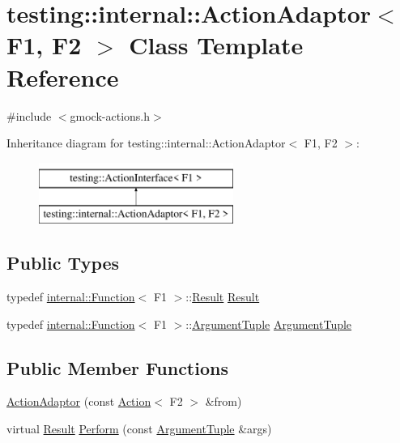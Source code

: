 \hypertarget{classtesting_1_1internal_1_1ActionAdaptor}{}\section{testing\+::internal\+::Action\+Adaptor$<$ F1, F2 $>$ Class Template Reference}
\label{classtesting_1_1internal_1_1ActionAdaptor}


{\ttfamily \#include $<$gmock-\/actions.\+h$>$}

Inheritance diagram for testing\+::internal\+::Action\+Adaptor$<$ F1, F2 $>$\+:\begin{figure}[H]
\begin{center}
\leavevmode
\includegraphics[height=2.000000cm]{classtesting_1_1internal_1_1ActionAdaptor}
\end{center}
\end{figure}
\subsection*{Public Types}
\begin{DoxyCompactItemize}
\item 
typedef \mbox{\hyperlink{structtesting_1_1internal_1_1Function}{internal\+::\+Function}}$<$ F1 $>$\+::\mbox{\hyperlink{classtesting_1_1internal_1_1ActionAdaptor_afa8f7872b6db3d8f1545fd98b45b0b95}{Result}} \mbox{\hyperlink{classtesting_1_1internal_1_1ActionAdaptor_afa8f7872b6db3d8f1545fd98b45b0b95}{Result}}
\item 
typedef \mbox{\hyperlink{structtesting_1_1internal_1_1Function}{internal\+::\+Function}}$<$ F1 $>$\+::\mbox{\hyperlink{classtesting_1_1internal_1_1ActionAdaptor_a4f78fb73f97b72fea8a93b78a8ab5704}{Argument\+Tuple}} \mbox{\hyperlink{classtesting_1_1internal_1_1ActionAdaptor_a4f78fb73f97b72fea8a93b78a8ab5704}{Argument\+Tuple}}
\end{DoxyCompactItemize}
\subsection*{Public Member Functions}
\begin{DoxyCompactItemize}
\item 
\mbox{\hyperlink{classtesting_1_1internal_1_1ActionAdaptor_a24ba3330ef3cc365b956c50ec73e4177}{Action\+Adaptor}} (const \mbox{\hyperlink{classtesting_1_1Action}{Action}}$<$ F2 $>$ \&from)
\item 
virtual \mbox{\hyperlink{classtesting_1_1internal_1_1ActionAdaptor_afa8f7872b6db3d8f1545fd98b45b0b95}{Result}} \mbox{\hyperlink{classtesting_1_1internal_1_1ActionAdaptor_a8d8a47a31f068cf6e0c95b91605d5540}{Perform}} (const \mbox{\hyperlink{classtesting_1_1internal_1_1ActionAdaptor_a4f78fb73f97b72fea8a93b78a8ab5704}{Argument\+Tuple}} \&args)
\end{DoxyCompactItemize}


